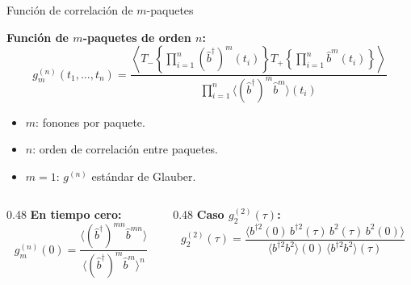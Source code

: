 \documentclass[
11pt,notheorems,hyperref={pdfauthor=whatever}
]{beamer}
\begin{document}
\begin{frame}{Función de correlación de $m$-paquetes}
	
	\vspace{-25pt}
	
	\textbf{Función de $m$-paquetes de orden $n$:}
	\begin{equation*}
		g_m^{(n)}(t_1,\ldots,t_n) =
		\frac{\left\langle T_-\!\left\{\prod_{i=1}^n
			(\hat{b}^\dagger)^m(t_i)\right\}
			T_+\!\left\{\prod_{i=1}^n \hat{b}^m(t_i)\right\}\right\rangle}
		{\prod_{i=1}^n \langle(\hat{b}^\dagger)^m\hat{b}^m\rangle(t_i)}
	\end{equation*}
	
	{\small
		\begin{itemize}\setlength{\itemsep}{12pt}
			
			\item $m$: fonones por paquete. 
			
			\item $n$: orden de correlación entre paquetes.
			
			\item $m=1$: $g^{(n)}$ estándar de Glauber.
			
		\end{itemize}
	}
	\vspace{8pt}
	
	\begin{columns}[T]
		\begin{column}{0.48\textwidth}
			\textbf{En tiempo cero:}
			\begin{equation*}
				g_m^{(n)}(0) =
				\frac{\langle(\hat{b}^\dagger)^{mn}\hat{b}^{mn}\rangle}
				{\langle(\hat{b}^\dagger)^m\hat{b}^m\rangle^n}
			\end{equation*}
		\end{column}
		\begin{column}{0.48\textwidth}
			\textbf{Caso $g_2^{(2)}(\tau)$:}
			\begin{equation*}
				g_2^{(2)}(\tau) =
				\frac{\langle b^{\dagger 2}(0)\,b^{\dagger 2}(\tau)\,
					b^2(\tau)\,b^2(0)\rangle}
				{\langle b^{\dagger 2}b^2\rangle(0)\,
					\langle b^{\dagger 2}b^2\rangle(\tau)}
			\end{equation*}
		\end{column}
	\end{columns}
	
\end{frame}
\end{document}
